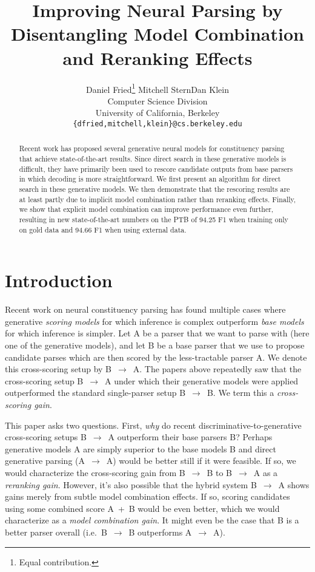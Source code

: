 \documentclass[11pt,a4paper]{article}
\title{Improving Neural Parsing by \\ Disentangling Model Combination and Reranking Effects}
\author{
Daniel Fried\thanks{\enskip Equal contribution.} \qquad Mitchell Stern\footnotemark[1] \qquad Dan Klein \\
Computer Science Division \\
University of California, Berkeley \\
{\tt \{dfried,mitchell,klein\}@cs.berkeley.edu}
}
\date{}
\newcommand{\p}{\ensuremath{\rightarrow}\xspace}
\begin{document}
\maketitle

\begin{abstract}

Recent work has proposed several generative neural models for constituency parsing that achieve state-of-the-art results. Since direct search in these generative models is difficult, they have primarily been used to rescore candidate outputs from base parsers in which decoding is more straightforward.  We first present an algorithm for direct search in these generative models.  We then demonstrate that the rescoring results are at least partly due to implicit model combination rather than reranking effects.  Finally, we show that explicit model combination can improve performance even further, resulting in new state-of-the-art numbers on the PTB of 94.25 F1 when training only on gold data and 94.66 F1 when using external data.

\end{abstract}

\section{Introduction}
\label{sec:introduction}

Recent work on neural constituency parsing \citep{dyer2016recurrent, Choe16Parsing}
has found multiple cases where generative \emph{scoring models} for which inference is complex outperform \emph{base models} for which inference is simpler. Let A be a parser that we want to parse with (here one of the generative models), and let B be a base parser that we use to propose candidate parses which are then scored by the less-tractable parser A. We denote this cross-scoring setup by \mbox{B \p A}.
The papers above repeatedly saw that the cross-scoring setup \mbox{B \p A} under which their generative models were applied outperformed the standard single-parser setup \mbox{B \p B}. We term this a \emph{cross-scoring gain}.

This paper asks two questions.  First, \emph{why} do recent discriminative-to-generative cross-scoring setups \mbox{B \p A} outperform their base parsers B?  Perhaps generative models A are simply superior to the base models B and direct generative parsing (\mbox{A \p A}) would be better still if it were feasible. If so, we would characterize the cross-scoring gain from \mbox{B \p B} to \mbox{B \p A} as a \emph{reranking gain}. However, it's also possible that the hybrid system \mbox{B \p A} shows gains merely from subtle model combination effects. If so, scoring candidates using some combined score \mbox{A + B} would be even better, which we would characterize as a \emph{model combination gain}.  It might even be the case that B is a better parser overall (i.e.\ \mbox{B \p B} outperforms \mbox{A \p A}).
\end{document}
